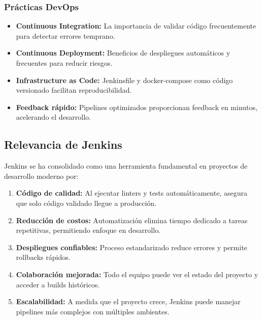 \documentclass[12pt,a4paper]{article}
\begin{document}
\subsubsection{Prácticas DevOps}

\begin{itemize}
    \item \textbf{Continuous Integration:} La importancia de validar código frecuentemente para detectar errores temprano.
    
    \item \textbf{Continuous Deployment:} Beneficios de despliegues automáticos y frecuentes para reducir riesgos.
    
    \item \textbf{Infrastructure as Code:} Jenkinsfile y docker-compose como código versionado facilitan reproducibilidad.
    
    \item \textbf{Feedback rápido:} Pipelines optimizados proporcionan feedback en minutos, acelerando el desarrollo.
\end{itemize}

\subsection{Relevancia de Jenkins}

Jenkins se ha consolidado como una herramienta fundamental en proyectos de desarrollo moderno por:

\begin{enumerate}
    \item \textbf{Código de calidad:} Al ejecutar linters y tests automáticamente, asegura que solo código validado llegue a producción.
    
    \item \textbf{Reducción de costos:} Automatización elimina tiempo dedicado a tareas repetitivas, permitiendo enfoque en desarrollo.
    
    \item \textbf{Despliegues confiables:} Proceso estandarizado reduce errores y permite rollbacks rápidos.
    
    \item \textbf{Colaboración mejorada:} Todo el equipo puede ver el estado del proyecto y acceder a builds históricos.
    
    \item \textbf{Escalabilidad:} A medida que el proyecto crece, Jenkins puede manejar pipelines más complejos con múltiples ambientes.
\end{enumerate}
\end{document}
